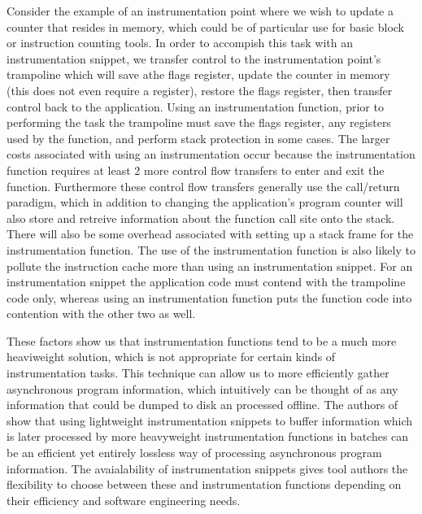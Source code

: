 Consider the example of an instrumentation point where we wish to update a counter that resides in memory, which could be of particular use for
basic block or instruction counting tools. In order to accompish this task with an instrumentation snippet, we transfer control to the
instrumentation point's trampoline which will save athe flags register, update the counter in memory (this does not even require a register), restore
the flags register, then transfer control back to the application. Using an instrumentation function, prior to performing
the task the trampoline must save the flags register, any registers used by the function, and perform stack protection in some cases. 
The larger costs associated with using an instrumentation occur because the instrumentation function requires at least 2 more control flow transfers
to enter and exit the function. Furthermore these control flow transfers generally use the call/return paradigm, which in addition to changing the
application's program counter will also store and retreive information about the function call site onto the stack. There will also be some overhead
associated with setting up a stack frame for the instrumentation function. The use of the instrumentation function is also likely to pollute the
instruction cache more than using an instrumentation snippet. For an instrumentation snippet the application code must contend with the trampoline code
only, whereas using an instrumentation function puts the function code into contention with the other two as well.

These factors show us that instrumentation functions tend to be a much more heaviweight solution, which is not appropriate for certain kinds of instrumentation
tasks. This technique can allow us to more efficiently gather asynchronous program information, which intuitively can be thought of as any information that could be dumped to
disk an processed offline. The authors of \cite{gao2005aliter} show that using lightweight instrumentation snippets to buffer information
which is later processed by more heavyweight instrumentation functions in batches can be an efficient yet entirely lossless way of processing asynchronous
program information. The avaialability of instrumentation snippets gives tool authors the flexibility to choose between these and instrumentation
functions depending on their efficiency and software engineering needs.


